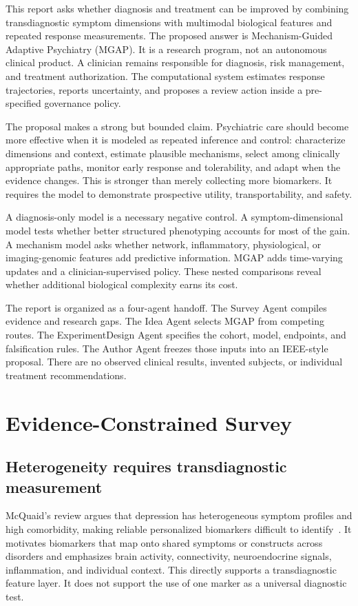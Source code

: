 \documentclass[conference]{IEEEtran}
\begin{document}
This report asks whether diagnosis and treatment can be improved by combining transdiagnostic symptom dimensions with multimodal biological features and repeated response measurements. The proposed answer is Mechanism-Guided Adaptive Psychiatry (MGAP). It is a research program, not an autonomous clinical product. A clinician remains responsible for diagnosis, risk management, and treatment authorization. The computational system estimates response trajectories, reports uncertainty, and proposes a review action inside a pre-specified governance policy.

The proposal makes a strong but bounded claim. Psychiatric care should become more effective when it is modeled as repeated inference and control: characterize dimensions and context, estimate plausible mechanisms, select among clinically appropriate paths, monitor early response and tolerability, and adapt when the evidence changes. This is stronger than merely collecting more biomarkers. It requires the model to demonstrate prospective utility, transportability, and safety.

A diagnosis-only model is a necessary negative control. A symptom-dimensional model tests whether better structured phenotyping accounts for most of the gain. A mechanism model asks whether network, inflammatory, physiological, or imaging-genomic features add predictive information. MGAP adds time-varying updates and a clinician-supervised policy. These nested comparisons reveal whether additional biological complexity earns its cost.

The report is organized as a four-agent handoff. The Survey Agent compiles evidence and research gaps. The Idea Agent selects MGAP from competing routes. The ExperimentDesign Agent specifies the cohort, model, endpoints, and falsification rules. The Author Agent freezes those inputs into an IEEE-style proposal. There are no observed clinical results, invented subjects, or individual treatment recommendations.

\section{Evidence-Constrained Survey}
\subsection{Heterogeneity requires transdiagnostic measurement}
McQuaid's review argues that depression has heterogeneous symptom profiles and high comorbidity, making reliable personalized biomarkers difficult to identify~\cite{mcquaid2021}. It motivates biomarkers that map onto shared symptoms or constructs across disorders and emphasizes brain activity, connectivity, neuroendocrine signals, inflammation, and individual context. This directly supports a transdiagnostic feature layer. It does not support the use of one marker as a universal diagnostic test.
\end{document}
